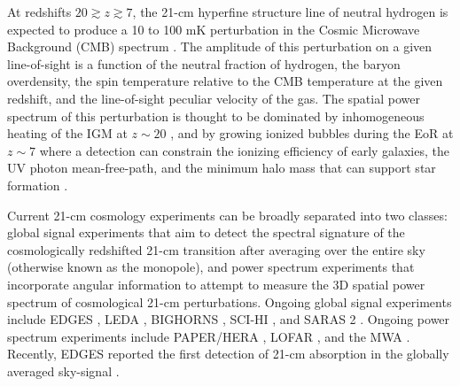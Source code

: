 \documentclass[twocolumn]{aastex61}
\begin{document}
At redshifts $20 \gtrsim z \gtrsim 7$, the 21-cm hyperfine structure line of neutral hydrogen is
expected to produce a 10 to 100 mK perturbation in the Cosmic Microwave Background (CMB) spectrum
\citep{2006PhR...433..181F, 2012RPPh...75h6901P}. The amplitude of this perturbation on a given
line-of-sight is a function of the neutral fraction of hydrogen, the baryon overdensity, the spin
temperature relative to the CMB temperature at the given redshift, and the line-of-sight peculiar
velocity of the gas.  The spatial power spectrum of this perturbation is thought to be dominated by
inhomogeneous heating of the IGM at $z\sim 20$ \citep{2014MNRAS.437L..36F}, and by growing ionized
bubbles during the EoR at $z\sim 7$ where a detection can constrain the ionizing efficiency of early
galaxies, the UV photon mean-free-path, and the minimum halo mass that can support star formation
\citep{2015MNRAS.449.4246G}.

Current 21-cm cosmology experiments can be broadly separated into two classes: global signal
experiments that aim to detect the spectral signature of the cosmologically redshifted 21-cm
transition after averaging over the entire sky (otherwise known as the monopole), and power spectrum
experiments that incorporate angular information to attempt to measure the 3D spatial power spectrum
of cosmological 21-cm perturbations.  Ongoing global signal experiments include EDGES
\citep{2017ApJ...847...64M}, LEDA \citep{2017arXiv170909313P}, BIGHORNS \citep{2015PASA...32....4S},
SCI-HI \citep{2014ApJ...782L...9V}, and SARAS 2 \citep{2017arXiv170306647S}.  Ongoing power spectrum
experiments include PAPER/HERA \citep{2015ApJ...809...61A, 2016arXiv160607473D}, LOFAR
\citep{2017ApJ...838...65P}, and the MWA \citep{2016ApJ...833..102B, 2016MNRAS.460.4320E}. Recently,
EDGES reported the first detection of 21-cm absorption in the globally averaged sky-signal
\citep{2018Natur.555...67B}.
\end{document}
